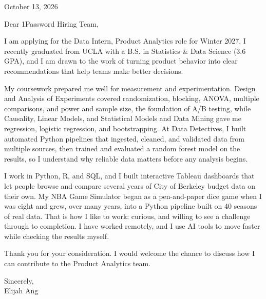 \documentclass[11pt,letterpaper]{article}
\begin{document}


\vspace{12pt}

October 13, 2026

Dear 1Password Hiring Team,

I am applying for the Data Intern, Product Analytics role for Winter 2027. I recently graduated from UCLA with a B.S. in Statistics \& Data Science (3.6 GPA), and I am drawn to the work of turning product behavior into clear recommendations that help teams make better decisions.

My coursework prepared me well for measurement and experimentation. Design and Analysis of Experiments covered randomization, blocking, ANOVA, multiple comparisons, and power and sample size, the foundation of A/B testing, while Causality, Linear Models, and Statistical Models and Data Mining gave me regression, logistic regression, and bootstrapping. At Data Detectives, I built automated Python pipelines that ingested, cleaned, and validated data from multiple sources, then trained and evaluated a random forest model on the results, so I understand why reliable data matters before any analysis begins.

I work in Python, R, and SQL, and I built interactive Tableau dashboards that let people browse and compare several years of City of Berkeley budget data on their own. My NBA Game Simulator began as a pen-and-paper dice game when I was eight and grew, over many years, into a Python pipeline built on 40 seasons of real data. That is how I like to work: curious, and willing to see a challenge through to completion. I have worked remotely, and I use AI tools to move faster while checking the results myself.

Thank you for your consideration. I would welcome the chance to discuss how I can contribute to the Product Analytics team.

Sincerely,\\
Elijah Ang
\end{document}
